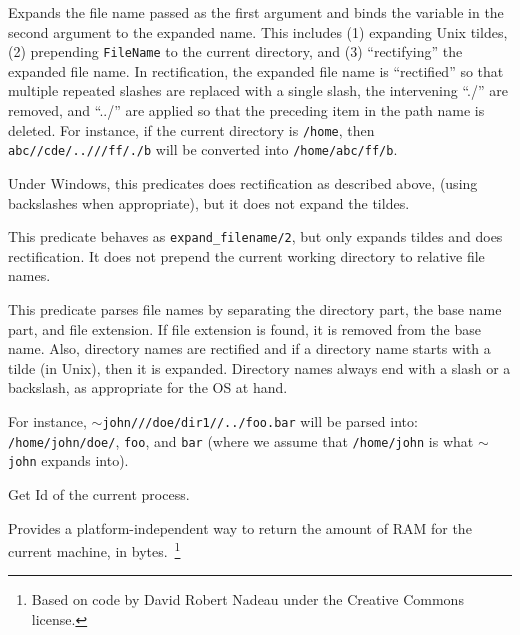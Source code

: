 \begin{description}
%
Expands the file name passed as the first argument and binds the
variable in the second argument to the expanded name. This includes
(1) expanding Unix tildes, (2) prepending {\tt FileName} to the
current directory, and (3) ``rectifying'' the expanded file name.  In
rectification, the expanded file name is ``rectified'' so that
multiple repeated slashes are replaced with a single slash, the
intervening ``./'' are removed, and ``../'' are applied so that the
preceding item in the path name is deleted. For instance, if the
current directory is {\tt /home}, then {\tt abc//cde/..///ff/./b} will
be converted into {\tt /home/abc/ff/b}.

Under Windows, this predicates does rectification as described above,
(using backslashes when appropriate), but it does not expand the
tildes.

This predicate behaves as {\tt expand\_filename/2}, but only expands
tildes and does rectification. It does not prepend the current working
directory to relative file names.

This predicate parses file names by separating the directory part, the base
name part, and file extension. If file extension is found, it is removed
from the base name. Also, directory names are rectified and if a directory
name starts with a tilde (in Unix), then it is expanded. Directory names
always end with a slash or a backslash, as appropriate for the OS at hand.

For instance, {\tt $\sim$john///doe/dir1//../foo.bar} will be parsed into:
{\tt /home/john/doe/}, {\tt foo}, and {\tt bar} (where we assume that    
{\tt /home/john} is what {\tt $\sim$john} expands into).  

%
Get Id of the current process.

%
Provides a platform-independent way to return the amount of RAM for
the current machine, in bytes.~\footnote{Based on code by David Robert
  Nadeau under the Creative Commons license.}

\end{description}

